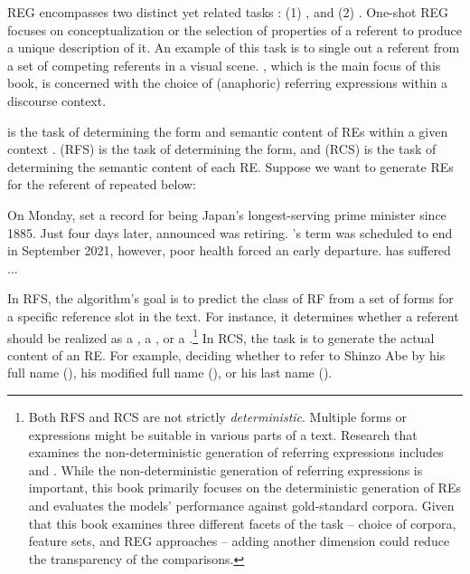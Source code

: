 REG encompasses two distinct yet related tasks \citep{krahmer2012computational,gatt2018survey}: (1) \term{\shot}, and (2) \context. One-shot REG focuses on conceptualization or the selection of properties of a referent to produce a unique description of it. An example of this task is to single out a referent from a set of competing referents in a visual scene. \context, which is the main focus of this book, is concerned with the choice of (anaphoric) referring expressions within a discourse context. 

\context is the task of determining the form and semantic content of REs within a given context \citep{reiter2000building}.  (RFS) is the task of determining the form, and  (RCS) is the task of determining the semantic content of each RE. Suppose we want to generate REs for the referent  of  repeated below:

\begin{exe}
	 On Monday,  set a record for being Japan's longest-serving prime minister since 1885. Just four days later,  announced  was retiring. 's term was scheduled to end in September 2021, however, poor health forced an early departure.  has suffered ...
\end{exe}

In RFS, the algorithm's goal is to predict the class of RF from a set of forms for a specific reference slot in the text. For instance, it determines whether a referent should be realized as a  , a , or a .\footnote{Both RFS and RCS are not strictly \emph{deterministic}. Multiple forms or expressions might be suitable in various parts of a text. Research that examines the non-deterministic generation of referring expressions includes \citet{castro-ferreira-etal-2016-towards-variation} and \citet{Gompel2019}. While the non-deterministic generation of referring expressions is important, this book primarily focuses on the deterministic generation of REs and evaluates the models' performance against gold-standard corpora. Given that this book examines three different facets of the task -- choice of corpora, feature sets, and REG approaches -- adding another dimension could reduce the transparency of the comparisons.} In RCS, the task is to generate the actual content of an RE. For example, deciding whether to refer to Shinzo Abe by his full name (), his modified full name (), or his last name (). 

